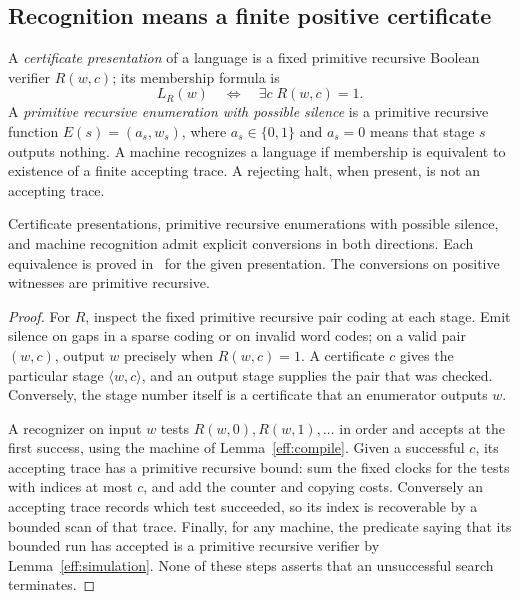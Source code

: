 \subsection{Recognition means a finite positive certificate}

\begin{definition}\label{eff:def-re}
A \emph{certificate presentation} of a language is a fixed primitive
recursive Boolean verifier $R(w,c)$; its membership formula is
\[
 L_R(w)\quad\Longleftrightarrow\quad \exists c\;R(w,c)=1.
\]
A \emph{primitive recursive enumeration with possible silence} is a
primitive recursive function $E(s)=(a_s,w_s)$, where $a_s\in\{0,1\}$ and
$a_s=0$ means that stage $s$ outputs nothing.  A machine recognizes a
language if membership is equivalent to existence of a finite accepting
trace.  A rejecting halt, when present, is not an accepting trace.
\end{definition}

\begin{theorem}
\label{eff:three-presentations}
Certificate presentations, primitive recursive enumerations with possible
silence, and machine recognition admit explicit conversions in both
directions.  Each equivalence is proved in \ipra\ for the given
presentation.  The conversions on positive witnesses are primitive
recursive.
\end{theorem}
\begin{proof}
For $R$, inspect the fixed primitive recursive pair coding at each stage.
Emit silence on gaps in a sparse coding or on invalid word codes; on a valid
pair $(w,c)$, output $w$ precisely when $R(w,c)=1$.  A certificate $c$ gives the
particular stage $\langle w,c\rangle$, and an output stage supplies the pair
that was checked.  Conversely, the stage number itself is a certificate
that an enumerator outputs $w$.

A recognizer on input $w$ tests $R(w,0),R(w,1),\ldots$ in order and accepts
at the first success, using the machine of Lemma~\ref{eff:compile}.  Given
a successful $c$, its accepting trace has a primitive recursive bound:
sum the fixed clocks for the tests with indices at most $c$, and add the
counter and copying costs.  Conversely an accepting trace records which
test succeeded, so its index is recoverable by a bounded scan of that
trace.  Finally, for any machine, the predicate saying that its bounded
run has accepted is a primitive recursive verifier by
Lemma~\ref{eff:simulation}.  None of these steps asserts that an
unsuccessful search terminates.
\end{proof}

